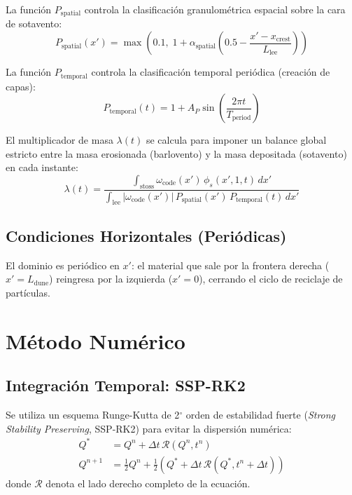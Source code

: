 \documentclass[11pt,a4paper]{article}
\begin{document}
La función $P_{\text{spatial}}$ controla la clasificación granulométrica espacial sobre la cara de sotavento:
\begin{equation}
    P_{\text{spatial}}(x') = \max\!\left(0.1,\; 1 + \alpha_{\text{spatial}}\left(0.5 - \frac{x' - x_{\text{crest}}}{L_{\text{lee}}}\right)\right)
\end{equation}

La función $P_{\text{temporal}}$ controla la clasificación temporal periódica (creación de capas):
\begin{equation}
    P_{\text{temporal}}(t) = 1 + A_P\sin\!\left(\frac{2\pi t}{T_{\text{period}}}\right)
\end{equation}

El multiplicador de masa $\lambda(t)$ se calcula para imponer un balance global estricto entre la masa erosionada (barlovento) y la masa depositada (sotavento) en cada instante:
\begin{equation}
    \lambda(t) = \frac{\displaystyle\int_{\text{stoss}} \omega_{\text{code}}(x') \, \phi_s(x', 1, t) \, dx'}{\displaystyle\int_{\text{lee}} |\omega_{\text{code}}(x')| \, P_{\text{spatial}}(x') \, P_{\text{temporal}}(t) \, dx'}
\end{equation}

\subsection{Condiciones Horizontales (Periódicas)}
El dominio es periódico en $x'$: el material que sale por la frontera derecha ($x' = L_{\text{dune}}$) reingresa por la izquierda ($x' = 0$), cerrando el ciclo de reciclaje de partículas.


\section{Método Numérico}

\subsection{Integración Temporal: SSP-RK2}
Se utiliza un esquema Runge-Kutta de 2$^\circ$ orden de estabilidad fuerte (\emph{Strong Stability Preserving}, SSP-RK2) para evitar la dispersión numérica:
\begin{align}
    Q^* &= Q^n + \Delta t \, \mathcal{R}(Q^n, t^n) \\
    Q^{n+1} &= \frac{1}{2}Q^n + \frac{1}{2}\left(Q^* + \Delta t \, \mathcal{R}(Q^*, t^n + \Delta t)\right)
\end{align}
donde $\mathcal{R}$ denota el lado derecho completo de la ecuación.
\end{document}
